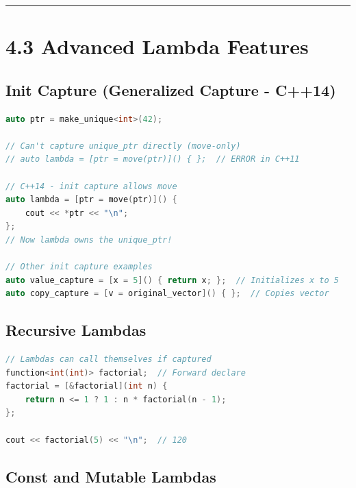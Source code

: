 \begin{center}\rule{0.5\linewidth}{0.5pt}\end{center}

\hypertarget{advanced-lambda-features}{%
\section{4.3 Advanced Lambda Features}\label{advanced-lambda-features}}

\hypertarget{init-capture-generalized-capture---c14}{%
\subsection{Init Capture (Generalized Capture -
C++14)}\label{init-capture-generalized-capture---c14}}

\begin{lstlisting}[language={C++}]
auto ptr = make_unique<int>(42);

// Can't capture unique_ptr directly (move-only)
// auto lambda = [ptr = move(ptr)]() { };  // ERROR in C++11

// C++14 - init capture allows move
auto lambda = [ptr = move(ptr)]() {
    cout << *ptr << "\n";
};
// Now lambda owns the unique_ptr!

// Other init capture examples
auto value_capture = [x = 5]() { return x; };  // Initializes x to 5
auto copy_capture = [v = original_vector]() { };  // Copies vector
\end{lstlisting}

\hypertarget{recursive-lambdas}{%
\subsection{Recursive Lambdas}\label{recursive-lambdas}}

\begin{lstlisting}[language={C++}]
// Lambdas can call themselves if captured
function<int(int)> factorial;  // Forward declare
factorial = [&factorial](int n) {
    return n <= 1 ? 1 : n * factorial(n - 1);
};

cout << factorial(5) << "\n";  // 120
\end{lstlisting}

\hypertarget{const-and-mutable-lambdas}{%
\subsection{Const and Mutable Lambdas}\label{const-and-mutable-lambdas}}

